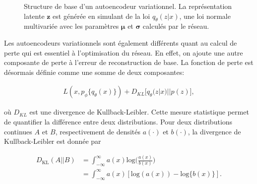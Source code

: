 \begin{figure}[ht]
	\caption[Structure de base d'un autoencodeur variationnel.]{Structure de base d'un autoencodeur variationnel. La représentation latente $\boldsymbol{z}$ est générée en simulant de la loi $q_{\theta}(z|x)$,  une loi normale multivariée avec les paramètres $\boldsymbol{\mu}$ et $\boldsymbol{\sigma}$ calculés par le réseau.}
	\label{fig:VAEstructure}
\end{figure}

Les autoencodeurs variationnels sont également différents quant au calcul de perte qui est essentiel à l'optimisation du réseau. En effet, on ajoute une autre composante de perte à l'erreur de reconstruction de base. La fonction de perte est désormais définie comme une somme de deux composantes:

\begin{gather}  \label{eq:loss_vae}
L(x, p_\phi\{q_\theta(x)\}) + D_{KL}\big[q_\theta(z|x) || p(z)\big],
\end{gather}


où $D_{KL}$ est une divergence de Kullback-Leibler. Cette mesure statistique permet de quantifier la différence entre deux distributions. Pour deux distributions continues $A$ et $B$, respectivement de densités $a(\cdot)$ et $b(\cdot)$, la divergence de Kullback-Leibler est donnée par

\begin{equation}  \label{eq:kl}
	\begin{aligned}
		D_{\text{KL}}(A || B) &= \int_{-\infty}^{\infty} a(x) \text{log} \Big(\frac{a(x)}{b(x)}\Big)  \\
		 &= \int_{-\infty}^{\infty} a(x) [\text{log}(a(x)) - \text{log}\{b(x)\}]\text{.}
	\end{aligned}
\end{equation}

